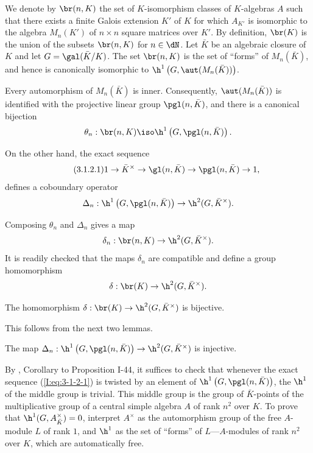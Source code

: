 \documentclass[oneside]{book}
\begin{document}
We denote by $\br(n,K)$ the set of $K$-isomorphism classes of
$K$-algebras $A$ such that there exists a finite Galois extension $K'$
of $K$ for which $A_{K'}$ is isomorphic to the algebra $M_n(K')$ of
$n\times n$ square matrices over $K'$. By definition, $\br(K)$ is the
union of the subsets $\br(n,K)$ for $n\in\dN$. Let $\bar K$ be an
algebraic closure of $K$ and let $G=\gal(\bar K/K)$. The set $\br(n,K)$
is the set of “forms” of $M_n(\bar K)$, and hence is canonically
isomorphic to $\h^1\left(G,\aut(M_n(\bar K))\right)$.

Every automorphism of $M_n(\bar K)$ is inner. Consequently,
$\aut(M_n(\bar K))$ is identified with the projective linear group
$\pgl(n,\bar K)$, and there is a canonical bijection
\[
  \theta_n : \br(n,K) \iso \h^1\left(G,\pgl(n,\bar K)\right)\text{.}
\]

On the other hand, the exact sequence
\begin{equation*}\tag{3.1.2.1}\label{I:eq:3-1-2-1}
  1 \to \bar K^\times \to \gl(n,\bar K) \to \pgl(n,\bar K) \to 1\text{,}
\end{equation*}
defines a coboundary operator
\[
  \Delta_n : \h^1\left(G,\pgl(n,\bar K)\right) \to \h^2(G,\bar K^\times)\text{.}
\]

Composing $\theta_n$ and $\Delta_n$ gives a map
\[
  \delta_n : \br(n,K) \to \h^2(G,\bar K^\times)\text{.}
\]
It is readily checked that the maps $\delta_n$ are compatible and define
a group homomorphism
\[
  \delta : \br(K) \to \h^2(G,\bar K^\times)\text{.}
\]

\begin{proposition}\label{I:3-1-3}
The homomorphism $\delta:\br(K)\to\h^2(G,\bar K^\times)$ is bijective.
\end{proposition}

This follows from the next two lemmas.

\begin{lemma}\label{I:3-1-4}
The map
$\Delta_n:\h^1\left(G,\pgl(n,\bar K)\right)\to
\h^2(G,\bar K^\times)$ is injective.
\end{lemma}

By \cite{se94}, Corollary to Proposition I-44, it suffices to check that
whenever the exact sequence (\ref{I:eq:3-1-2-1}) is twisted by an element
of $\h^1\left(G,\pgl(n,\bar K)\right)$, the $\h^1$ of the middle group
is trivial. This middle group is the group of $\bar K$-points of the
multiplicative group of a central simple algebra $A$ of rank $n^2$ over
$K$. To prove that $\h^1(G,A_{\bar K}^\times)=0$, interpret $A^\times$
as the automorphism group of the free $A$-module $L$ of rank $1$, and
$\h^1$ as the set of “forms” of $L$---$A$-modules of rank $n^2$ over
$K$, which are automatically free.
\end{document}
